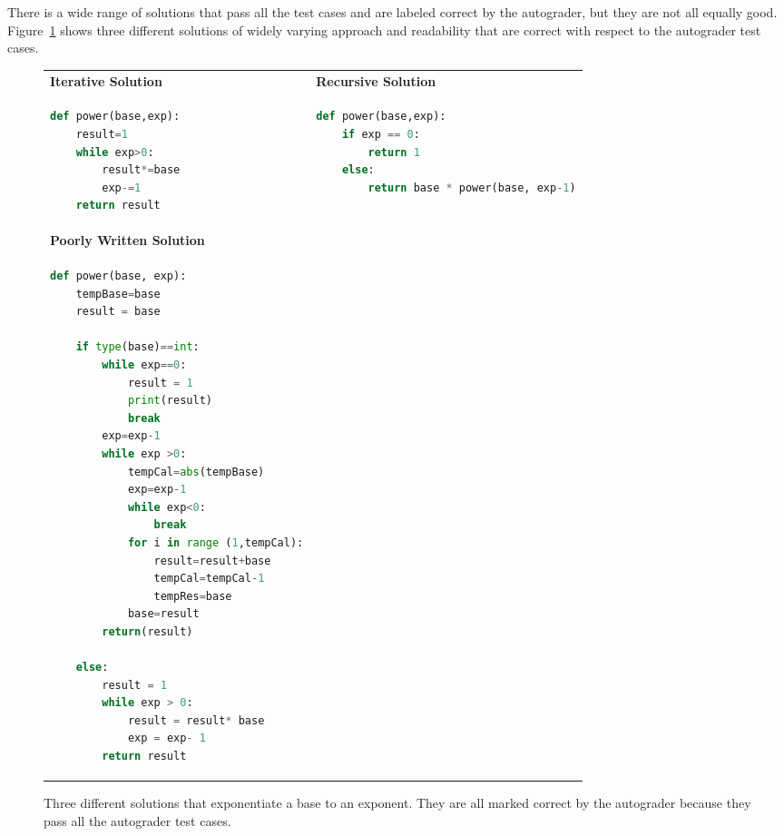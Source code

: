 \documentclass[12pt,twoside]{mitthesis}
\begin{document}
There is a wide range of solutions that pass all the test cases and are labeled correct by the autograder, but they are not all equally good. Figure~\ref{table:diffapproaches} shows three different solutions of widely varying approach and readability that are correct with respect to the autograder test cases.

\begin{figure}
\begin{tabular}{ll}
{\bf Iterative Solution} & {\bf Recursive Solution} \\
\begin{minipage}{0.5\linewidth}
\begin{lstlisting}[basicstyle=\linespread{1.0}\ttfamily\footnotesize,language=python]
def power(base,exp):
    result=1
    while exp>0:
        result*=base
        exp-=1
    return result
\end{lstlisting}
\end{minipage}
&
\begin{minipage}{0.5\linewidth}
\begin{lstlisting}[basicstyle=\linespread{1.0}\ttfamily\footnotesize,language=python]
def power(base,exp):
    if exp == 0:
        return 1
    else:
        return base * power(base, exp-1)
\end{lstlisting}
\end{minipage} \\

{\bf Poorly Written Solution} & \\
\begin{minipage}{0.5\linewidth}
\begin{lstlisting}[basicstyle=\linespread{1.0}\ttfamily\footnotesize,language=python]
def power(base, exp):
    tempBase=base
    result = base

    if type(base)==int:
        while exp==0:
            result = 1
            print(result)
            break
        exp=exp-1
        while exp >0:
            tempCal=abs(tempBase)
            exp=exp-1
            while exp<0:
                break
            for i in range (1,tempCal):
                result=result+base
                tempCal=tempCal-1
                tempRes=base
            base=result
        return(result)

    else:
        result = 1
        while exp > 0:
            result = result* base
            exp = exp- 1
        return result
\end{lstlisting}
\end{minipage} 
\end{tabular}
\caption{Three different solutions that exponentiate a base to an exponent. They are all marked correct by the autograder because they pass all the autograder test cases.}
\label{table:diffapproaches}
\end{figure}
\end{document}
